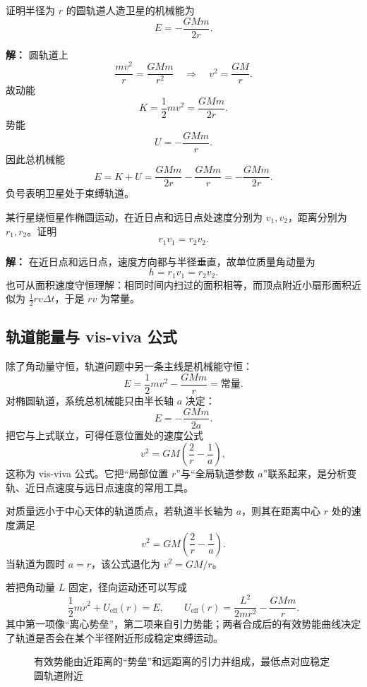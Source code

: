 \begin{example}
证明半径为 $r$ 的圆轨道人造卫星的机械能为
\[
E=-\frac{GMm}{2r}.
\]

\textbf{解：} 圆轨道上
\[
\frac{mv^2}{r}=\frac{GMm}{r^2}\quad\Rightarrow\quad v^2=\frac{GM}{r}.
\]
故动能
\[
K=\frac{1}{2}mv^2=\frac{GMm}{2r}.
\]
势能
\[
U=-\frac{GMm}{r}.
\]
因此总机械能
\[
E=K+U=\frac{GMm}{2r}-\frac{GMm}{r}=-\frac{GMm}{2r}.
\]
负号表明卫星处于束缚轨道。
\end{example}

\begin{example}
某行星绕恒星作椭圆运动，在近日点和远日点处速度分别为 $v_1,v_2$，距离分别为 $r_1,r_2$。证明
\[
r_1v_1=r_2v_2.
\]

\textbf{解：} 在近日点和远日点，速度方向都与半径垂直，故单位质量角动量为
\[
h=r_1v_1=r_2v_2.
\]
也可从面积速度守恒理解：相同时间内扫过的面积相等，而顶点附近小扇形面积近似为 $\frac12 rv\Delta t$，于是 $rv$ 为常量。
\end{example}

\subsection{轨道能量与 vis-viva 公式}

除了角动量守恒，轨道问题中另一条主线是机械能守恒：
\[
E=\frac12 mv^2-\frac{GMm}{r}=\text{常量}.
\]
对椭圆轨道，系统总机械能只由半长轴 $a$ 决定：
\[
E=-\frac{GMm}{2a}.
\]
把它与上式联立，可得任意位置处的速度公式
\[
v^2=GM\left(\frac{2}{r}-\frac{1}{a}\right),
\]
这称为 vis-viva 公式。它把“局部位置 $r$”与“全局轨道参数 $a$”联系起来，是分析变轨、近日点速度与远日点速度的常用工具。

\begin{theorem}
对质量远小于中心天体的轨道质点，若轨道半长轴为 $a$，则其在距离中心 $r$ 处的速度满足
\[
v^2=GM\left(\frac{2}{r}-\frac{1}{a}\right).
\]
当轨道为圆时 $a=r$，该公式退化为 $v^2=GM/r$。
\end{theorem}

若把角动量 $L$ 固定，径向运动还可以写成
\[
\frac{1}{2}m\dot r^2 + U_{\text{eff}}(r)=E,
\qquad
U_{\text{eff}}(r)=\frac{L^2}{2mr^2}-\frac{GMm}{r}.
\]
其中第一项像“离心势垒”，第二项来自引力势能；两者合成后的有效势能曲线决定了轨道是否会在某个半径附近形成稳定束缚运动。

\begin{figure}[htbp]
\centering
{}
\caption{有效势能由近距离的“势垒”和远距离的引力井组成，最低点对应稳定圆轨道附近}
\end{figure}

